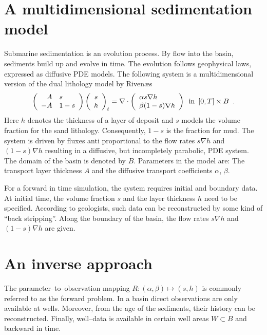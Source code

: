 \section{A multidimensional sedimentation model}

Submarine sedimentation is an evolution process.
By flow into the basin, sediments build up and evolve in time.
The evolution follows geophysical laws, expressed as diffusive PDE models.
The following system is a multidimensional version of the dual lithology model by Riven{\ae}s \cite{Rivenaes1992, Rivenaes1993}
\begin{equation} \label{model}
\left(\begin{array}{rl} A & s \\ -A & 1-s \end{array}\right)
\left(\begin{array}{c} s \\ h \end{array}\right)_t =
\nabla \cdot \left( \begin{array}{l} \alpha s \nabla h \\ \beta (1-s) \nabla h \end{array} \right)
\enspace \hbox{in} \enspace [0,T] \times B \enspace .
\end{equation}
Here $h$ denotes the thickness of a layer of deposit and
$s$ models the volume fraction for the sand lithology.
Consequently, $1-s$ is the fraction for mud.
The system is driven by fluxes anti proportional to the flow rates
$s \nabla h$ and $(1-s) \nabla h$
resulting in a diffusive, but incompletely parabolic, PDE system.
The domain of the basin is denoted by $B$.
Parameters in the model are:
The transport layer thickness $A$ and the diffusive transport coefficients $\alpha$, $\beta$.

For a forward in time simulation, the system requires initial and boundary data.
At initial time, the volume fraction $s$ and the layer thickness $h$ need to be specified.
According to geologists, such data can be reconstructed by some kind of ``back stripping''.
Along the boundary of the basin, the flow rates $s \nabla h$ and $(1-s) \nabla h$ are given.

\section{An inverse approach}

The parameter--to--observation mapping
$R: (\alpha, \beta) \mapsto (s, h)$
is commonly referred to as the forward problem.
In a basin direct observations are only available at wells.
Moreover, from the age of the sediments, their history can be reconstructed.
Finally, well--data is available in certain well areas $W \subset B$ and backward in time.

